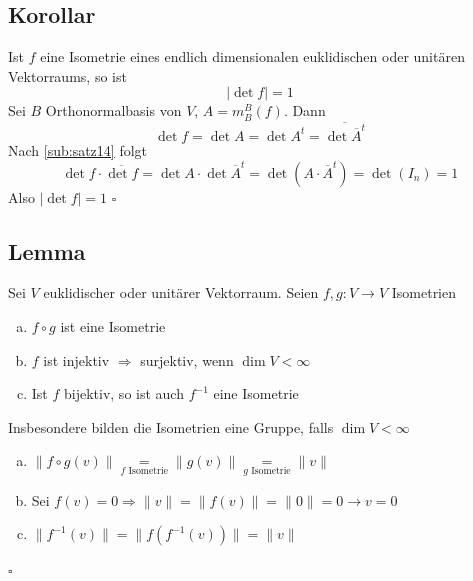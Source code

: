 \subsection[Korollar über die Determinante einer Isometrie]{Korollar} %
\label{sub:korollar15}
Ist $f$ eine Isometrie  eines endlich dimensionalen euklidischen oder unitären Vektorraums, so ist
\[
	| \det f | = 1
\]
Sei $B$ Orthonormalbasis von $V$, $A=m_B^B(f)$. Dann 
\[
	\det f = \det A  =\det A^t  = \overline{\det \overline{A}^t }
\]
Nach \ref{sub:satz14} folgt 
\[
	\det f \cdot  \overline{\det f} = \det A \cdot \det \overline{A}^t = \det (A \cdot  \overline{A}^t )  = \det (I_n) = 1 
\]
Also $|\det f | = 1$ \hfill \( \square \)


\subsection[Lemma über die Gruppe der Isometrien]{Lemma} %
\label{sub:lemma16}
Sei $V$ euklidischer oder unitärer Vektorraum. Seien $f,g : V \to V$ Isometrien
\begin{enumerate}[a)]
	\item $f \circ g$ ist eine Isometrie
	\item $f$ ist injektiv \hfill {\color{light_gray} $\Rightarrow $ surjektiv, wenn $\dim V < \infty$}
	\item Ist $f$ bijektiv, so ist auch $f ^{-1}$ eine Isometrie
\end{enumerate}
Insbesondere bilden die Isometrien eine Gruppe, falls $\dim V < \infty$
\begin{enumerate}[a)]
	\item $\| f \circ g (v) \| \underset{f \text{ Isometrie}}{=} \| g(v) \| \underset{g \text{ Isometrie}}{=} \| v\|$
	\item Sei $f(v)= 0 \Longrightarrow \| v \| = \| f(v) \| = \| 0\| = 0 \rightarrow v=0$
	\item $\| f ^{-1} (v) \| = \| f \left( f ^{-1} (v) \right) \| = \| v \|$
\end{enumerate}
\hfill \( \square \)

